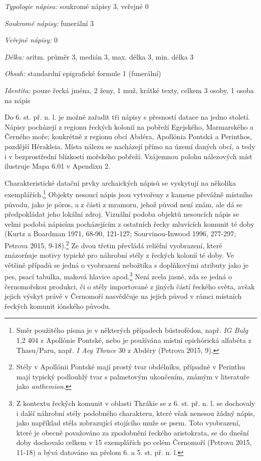 {\em Typologie nápisu:} soukromé nápisy 3, veřejné 0

{\em Soukromé nápisy:} funerální 3

{\em Veřejné nápisy:} 0

{\em Délka:} aritm. průměr 3, medián 3, max. délka 3, min. délka 3

{\em Obsah:} standardní epigrafické formule 1 (funerální)

{\em Identita:} pouze řecká jména, 2 ženy, 1 muž, krátké texty, celkem 3 osoby, 1 osoba na nápis

\NC\AR
\HL
\HL
\stoptable

Do 6. st. př. n. l. je možné zařadit tři nápisy s přesností datace na jedno století. Nápisy pocházejí z regionu řeckých kolonií na pobřeží Egejského, Marmarského a Černého moře; konkrétně z regionu obcí Abdéra, Apollónia Pontská a Perinthos, pozdější Hérakleia. Místa nálezu se nacházejí přímo na území daných obcí, a tedy i v bezprostřední blízkosti mořského pobřeží. Vzájemnou polohu nálezových míst ilustruje Mapa 6.01 v Apendixu 2.

Charakteristické datační prvky archaických nápisů se vyskytují na několika exemplářích.\footnote{Směr použitého písma je v některých případech bústrofédon, např. {\em IG Bulg} 1,2 404 z Apollónie Pontské, nebo je používána místní epichórická alfabéta z Thasu/Paru, např. {\em I Aeg Thrace} 30 z Abdéry (Petrova 2015, 9).} Objekty nesoucí nápis jsou vytvořeny z kamene převážně místního původu, jako je póros, a z části z mramoru, jehož původ není znám, ale dá se předpokládat jeho lokální zdroj. Vizuální podoba objektů nesoucích nápis se velmi podobá nápisům pocházejícím z ostatních řecky mluvících komunit té doby (Kurtz a Boardman 1971, 68-90, 121-127; Sourvinou-Inwood 1996, 277-297; Petrova 2015, 9-18).\footnote{Stély v Apollónii Pontské mají prostý tvar obdélníku, případně v Perinthu mají typický podlouhlý tvar s palmetovým ukončením, známým v literatuře jako {\em anthemion}.} Ze dvou třetin převládá reliéfní vyobrazení, které znázorňuje motivy typické pro náhrobní stély z řeckých kolonií té doby. Ve většině případů se jedná o vyobrazení nebožtíka s doplňkovými atributy jako je pes, psací tabulka, maková hlavice apod.\footnote{Z kontextu řeckých komunit v oblasti Thrákie se z 6. st. př. n. l. se dochovaly i další náhrobní stély podobného charakteru, které však nenesou žádný nápis, jako například stéla zobrazující stojícího muže se psem. Toto vyobrazení, které je obecně považováno za zpodobnění řeckého aristokrata, se do dnešní doby dochovalo celkem v 15 exemplářích po celém Černomoří (Petrova 2015, 11-18) a bývá datováno na přelom 6. a 5. st. př. n. l.} Není zcela jasné, zda se jedná o černomořskou produkci, či o stély importované z jiných částí řeckého světa, avšak jejich výskyt právě v Černomoří nasvědčuje na jejich původ v rámci místních řeckých komunit iónského původu.

